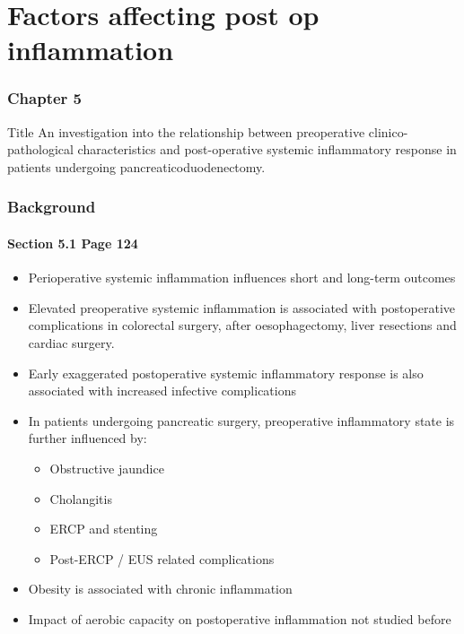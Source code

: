 \documentclass[10pt]{beamer}
\begin{document}
\section[Chapter 5]{Factors affecting post op inflammation}

\begin{frame}
	\frametitle{Chapter 5}
	\begin{block}{Title}
		An investigation into the relationship between preoperative clinico-pathological characteristics and post-operative systemic inflammatory response in patients undergoing pancreaticoduodenectomy.
	\end{block}
\end{frame}

\begin{frame}
	\frametitle{Background}
	\framesubtitle{Section 5.1 Page 124}
	\begin{itemize}
		\item Perioperative systemic inflammation influences short and long-term outcomes
		\item Elevated preoperative systemic inflammation is associated with postoperative complications in colorectal surgery, after oesophagectomy, liver resections and cardiac surgery. 
		\item Early exaggerated postoperative systemic inflammatory response is also associated with increased infective complications
		\item In patients undergoing pancreatic surgery, preoperative inflammatory state is further influenced by:
		\begin{itemize}
			\item Obstructive jaundice
			\item Cholangitis
			\item ERCP and stenting
			\item Post-ERCP / EUS related complications
		\end{itemize}
		\item Obesity is associated with chronic inflammation
		\item Impact of aerobic capacity on postoperative inflammation not studied before
	\end{itemize}
\end{frame}
\end{document}
